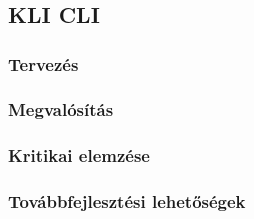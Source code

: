 \chapter{\kli}
\section{KLI CLI}
\subsection{Tervezés}
\subsection{Megvalósítás}
\subsection{Kritikai elemzése}
\subsection{Továbbfejlesztési lehetőségek}